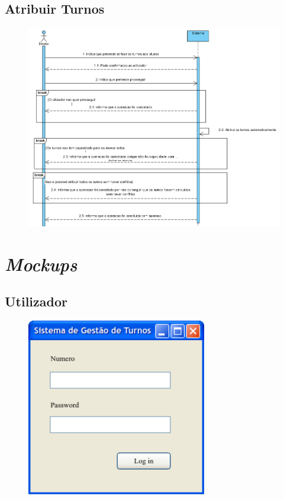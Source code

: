 \documentclass[12pt,a4paper]{report}
\begin{document}
\begin{appendices}
\section{Atribuir Turnos}
\begin{figure}[H]
	\centering 
	\includegraphics[width=\textwidth]{modelacao/use_case_diagram/atribuirturnos.png}  
\end{figure}

\chapter{\emph{Mockups}}
\section{Utilizador}
\begin{figure}[H]
	\centering 
	\includegraphics[width=0.7\textwidth]{modelacao/mockups/login.png}  
\end{figure}


\end{appendices}
\end{document}
